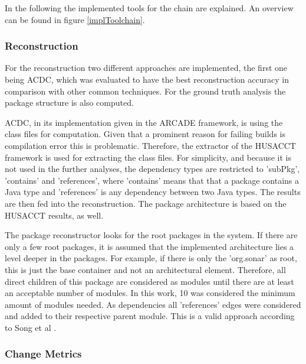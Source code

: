 \documentclass[conference]{IEEEtran}
\begin{document}
In the following the implemented tools for the chain are explained. An overview can be found in figure \ref{implToolchain}.

\subsubsection{Reconstruction}

For the reconstruction two different approaches are implemented, the first one being ACDC, which was evaluated to have the best reconstruction accuracy \cite{arcRec-comparison} in comparison with other common techniques. For the ground truth analysis the package structure is also computed. 

ACDC, in its implementation given in the ARCADE framework, is using the class files for computation. Given that a prominent reason for failing builds is compilation error this is problematic. Therefore, the extractor of the HUSACCT framework is used for extracting the class files. For simplicity, and because it is not used in the further analyses, the dependency types are restricted to 'subPkg', 'contains' and 'references', where 'contains' means that that a package contains a Java type and 'references' is any dependency between two Java types. The results are then fed into the reconstruction. The package architecture is based on the HUSACCT results, as well. 

The package reconstructor looks for the root packages in the system. If there are only a few root packages, it is assumed that the implemented architecture lies a level deeper in the packages. For example, if there is only the 'org.sonar' as root, this is just the base container and not an architectural element. Therefore, all direct children of this package are considered as modules until there are at least an acceptable number of modules. In this work, 10 was considered the minimum amount of modules needed. As dependencies all 'references' edges were considered and added to their respective parent module. This is a valid approach according to Song et al \cite{ArcAsGraph}. 

\subsubsection{Change Metrics}
\end{document}
